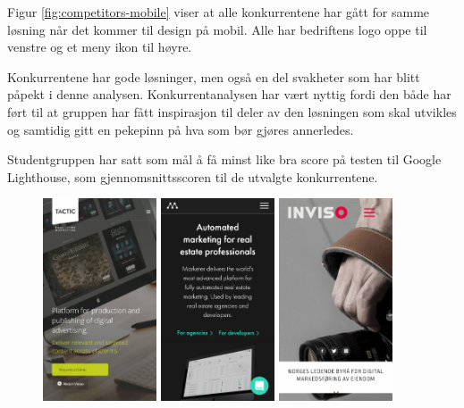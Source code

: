 Figur \ref{fig:competitors-mobile} viser at alle konkurrentene har gått for samme løsning når det kommer til design på mobil. Alle har bedriftens logo oppe til venstre og et meny ikon til høyre.

Konkurrentene har gode løsninger, men også en del svakheter som har blitt påpekt i denne analysen. Konkurrentanalysen har vært nyttig fordi den både har ført til at gruppen har fått inspirasjon til deler av den løsningen som skal utvikles og samtidig gitt en pekepinn på hva som bør gjøres annerledes.

Studentgruppen har satt som mål å få minst like bra score på testen til Google Lighthouse, som gjennomsnittsscoren til de utvalgte konkurrentene.
\begin{figure}[H]
    \begin{center}
        \includegraphics[width=0.3\textwidth]{line/tacticrealtime_com_(iPhone_6_7_8).png}
        \includegraphics[width=0.3\textwidth]{line/marketer_tech_(iPhone_6_7_8).png}
        \includegraphics[width=0.3\textwidth]{line/inviso_no_(iPhone_6_7_8).png}

\end{center}
\end{figure}
